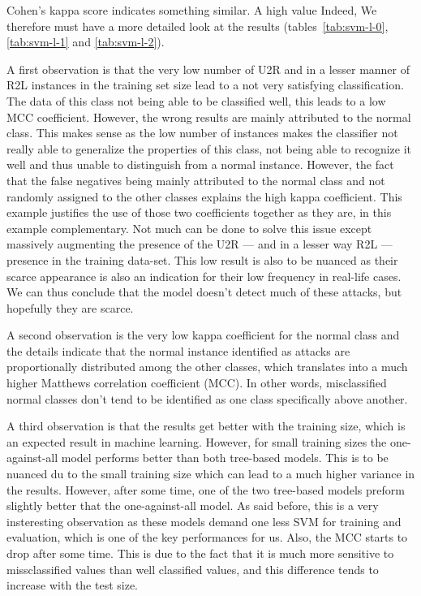 Cohen's kappa score indicates something similar. A high value Indeed, We therefore must have a more detailed look at the results (tables~\ref{tab:svm-l-0}, \ref{tab:svm-l-1} and \ref{tab:svm-l-2}). 

A first observation is that the very low number of U2R and in a lesser manner of R2L instances in the training set size lead to a not very satisfying classification. The data of this class not being able to be classified well, this leads to a low MCC coefficient. However, the wrong results are mainly attributed to the normal class. This makes sense as the low number of instances makes the classifier not really able to generalize the properties of this class, not being able to recognize it well and thus unable to distinguish from a normal instance. However, the fact that the false negatives being mainly attributed to the normal class and not randomly assigned to the other classes explains the high kappa coefficient. This example justifies the use of those two coefficients together as they are, in this example complementary. Not much can be done to solve this issue except massively augmenting the presence of the U2R --- and in a lesser way R2L --- presence in the training data-set. This low result is also to be nuanced as their scarce appearance is also an indication for their low frequency in real-life cases. We can thus conclude that the model doesn't detect much of these attacks, but hopefully they are scarce. 

A second observation is the very low kappa coefficient for the normal class and the details indicate that the normal instance identified as attacks are proportionally distributed among the other classes, which translates into a much higher Matthews correlation coefficient (MCC). In other words, misclassified normal classes don't tend to be identified as one class specifically above another.

A third observation is that the results get better with the training size, which is an expected result in machine learning. However, for small training sizes the one-against-all model performs better than both tree-based models. This is to be nuanced du to the small training size which can lead to a much higher variance in the results. However, after some time, one of the two tree-based models preform slightly better that the one-against-all model. As said before, this is a very insteresting observation as these models demand one less SVM for training and evaluation, which is one of the key performances for us. Also, the MCC starts to drop after some time. This is due to the fact that it is much more sensitive to missclassified values than well classified values, and this difference tends to increase with the test size.

